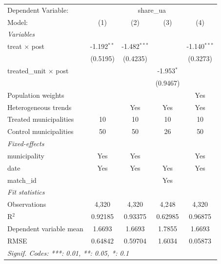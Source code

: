 
\begingroup
\centering
\begin{tabular}{lcccc}
   \tabularnewline \midrule \midrule
   Dependent Variable: & \multicolumn{4}{c}{share\_ua}\\
   Model:                        & (1)           & (2)            & (3)          & (4)\\  
   \midrule
   \emph{Variables}\\
   treat $\times$ post           & -1.192$^{**}$ & -1.482$^{***}$ &              & -1.140$^{***}$\\   
                                 & (0.5195)      & (0.4235)       &              & (0.3273)\\   
   treated\_unit $\times$ post   &               &                & -1.953$^{*}$ &   \\   
                                 &               &                & (0.9467)     &   \\   
   Population weights            &               &                &              & Yes\\  
   Heterogeneous trends          &               & Yes            & Yes          & Yes\\  
   Treated municipalities        & 10            & 10             & 10           & 10\\  
   Control municipalities        & 50            & 50             & 26           & 50\\  
   \midrule
   \emph{Fixed-effects}\\
   municipality                  & Yes           & Yes            &              & Yes\\  
   date                          & Yes           & Yes            & Yes          & Yes\\  
   match\_id                     &               &                & Yes          & \\  
   \midrule
   \emph{Fit statistics}\\
   Observations                  & 4,320         & 4,320          & 4,248        & 4,320\\  
   R$^2$                         & 0.92185       & 0.93375        & 0.62985      & 0.96875\\  
   Dependent variable mean       & 1.6693        & 1.6693         & 1.7855       & 1.6693\\  
   RMSE                          & 0.64842       & 0.59704        & 1.6034       & 0.05873\\  
   \midrule \midrule
   \multicolumn{5}{l}{\emph{Signif. Codes: ***: 0.01, **: 0.05, *: 0.1}}\\
\end{tabular}
\par\endgroup


